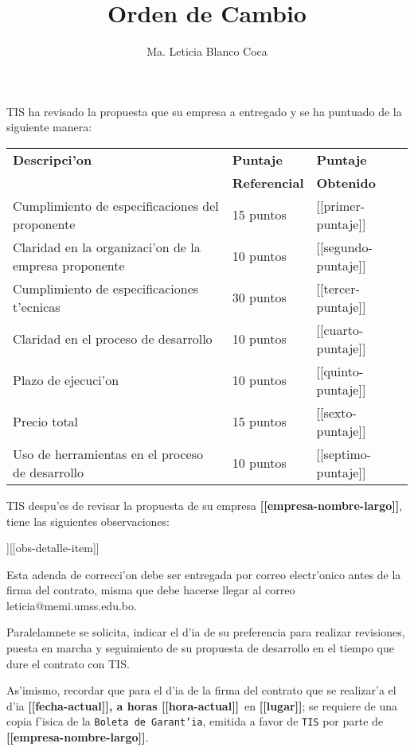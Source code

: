 \documentclass[10pt,letterpaper,twoside]{article}
\newcommand{\empresa}[0]{\textbf{[[empresa-nombre-largo]]}}
\newcommand{\diayhora}[0]{\textbf{[[fecha-actual]], a horas [[hora-actual]]}}
\newcommand{\lugar}[0]{\textbf{[[lugar]]}}
\newcommand{\pp}[0]{[[primer-puntaje]]}
\newcommand{\sep}[0]{[[segundo-puntaje]]}
\newcommand{\tp}[0]{[[tercer-puntaje]]}
\newcommand{\cp}[0]{[[cuarto-puntaje]]}
\newcommand{\qp}[0]{[[quinto-puntaje]]}
\newcommand{\ssp}[0]{[[sexto-puntaje]]}
\newcommand{\sssp}[0]{[[septimo-puntaje]]}
\newcommand{\observacionesDetalle}[[obs-detalle]]
\newcommand{\observaciones}[0]{\observacionesDetalle[[obs-detalle-item]]}
\begin{document}
\title{Orden de Cambio}
\author{Ma. Leticia Blanco Coca}
\maketitle


TIS ha revisado la propuesta que su empresa a entregado y se ha puntuado de la siguiente manera:

\begin{tabular}{|l|l|l|}
\hline \textbf{Descripci'on}& \textbf{Puntaje}&\textbf{Puntaje} \\
& \textbf{Referencial}&\textbf{Obtenido} \\
\hline Cumplimiento de especificaciones del proponente       & 15 puntos & \pp \\
\hline Claridad en la organizaci'on de la empresa proponente & 10 puntos & \sep \\
\hline Cumplimiento de especificaciones t'ecnicas            & 30 puntos & \tp \\ 
\hline Claridad en el proceso de desarrollo                  & 10 puntos & \cp \\
\hline Plazo de ejecuci'on                                   & 10 puntos & \qp \\
\hline Precio total                                          & 15 puntos & \ssp \\
\hline Uso de herramientas en el proceso de desarrollo       & 10 puntos & \sssp \\
\hline
\end{tabular}

TIS despu'es de revisar la propuesta de su empresa \empresa, tiene las siguientes observaciones:

\begin{enumerate}
\observaciones
\end{enumerate}

Esta adenda de correcci'on debe ser entregada por correo electr'onico antes de la firma del contrato, misma que debe hacerse llegar al correo leticia@memi.umss.edu.bo.


Paralelamnete se solicita, indicar el d'ia de su preferencia para realizar revisiones, puesta
en marcha  y 
seguimiento de su propuesta de desarrollo en el tiempo que dure el contrato con TIS.


As'imismo, recordar que para el d'ia de la firma del contrato que se realizar'a el d'ia \diayhora\ en \lugar; se requiere de una copia f'isica
 de la 
\texttt{Boleta de Garant'ia}, emitida a favor de \texttt{TIS} por parte de \empresa.
\end{document}
